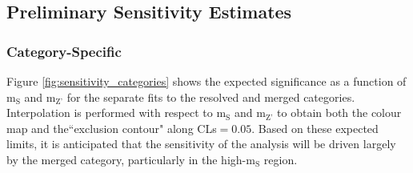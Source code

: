 \documentclass[12pt]{article}
\begin{document}
\subsection{Preliminary Sensitivity Estimates}

\subsubsection{Category-Specific}

Figure \ref{fig:sensitivity_categories} shows the expected significance as a function of m$_\text{S}$ and m$_\text{Z'}$ for the separate fits to the resolved and merged categories. Interpolation is performed with respect to m$_\text{S}$ and m$_\text{Z'}$ to obtain both the colour map and the``exclusion contour" along CLs$=0.05$. Based on these expected limits, it is anticipated that the sensitivity of the analysis will be driven largely by the merged category, particularly in the high-m$_\text{S}$ region. 
\end{document}
